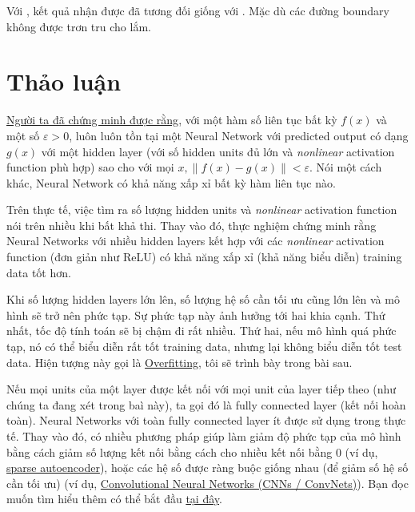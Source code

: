 \item Với , kết quả nhận được đã tương đối giống với . Mặc dù các đường boundary không được trơn tru cho lắm. 
 
 
\section{Thảo luận}
 
\item \href{http://www.dartmouth.edu/~gvc/Cybenko_MCSS.pdf}{Người ta đã chứng minh được rằng}, với một hàm số liên tục bất kỳ $f(x)$ và một số $\varepsilon >0$, luôn luôn tồn tại một Neural Network với predicted output có dạng $g(x)$ với một hidden layer (với số hidden units đủ lớn và \textit{nonlinear} activation function phù hợp) sao cho với mọi $x, \|f(x) - g(x)\| < \varepsilon$. Nói một cách khác, Neural Network có khả năng xấp xỉ bất kỳ hàm liên tục nào. 
 
\item Trên thực tế, việc tìm ra số lượng hidden units và \textit{nonlinear} activation function nói trên nhiều khi bất khả thi. Thay vào đó, thực nghiệm chứng minh rằng Neural Networks với nhiều hidden layers kết hợp với các \textit{nonlinear} activation function (đơn giản như ReLU) có khả năng xấp xỉ (khả năng biểu diễn) training data tốt hơn. 
 
\item Khi số lượng hidden layers lớn lên, số lượng hệ số cần tối ưu cũng lớn lên và mô hình sẽ trở nên phức tạp. Sự phức tạp này ảnh hưởng tới hai khia cạnh. Thứ nhất, tốc độ tính toán sẽ bị chậm đi rất nhiều. Thứ hai, nếu mô hình quá phức tạp, nó có thể biểu diễn rất tốt training data, nhưng lại không biểu diễn tốt test data. Hiện tượng này gọi là \href{https://en.wikipedia.org/wiki/Overfitting}{Overfitting}, tôi sẽ trình bày trong bài sau. 
 
\item Nếu mọi units của một layer được kết nối với mọi unit của layer tiếp theo (như chúng ta đang xét trong baì này), ta gọi đó là fully connected layer (kết nối hoàn toàn). Neural Networks với toàn fully connected layer ít được sử dụng trong thực tế. Thay vào đó, có nhiều phương pháp giúp làm giảm độ phức tạp của mô hình bằng cách giảm số lượng kết nối bằng cách cho nhiều kết nối bằng 0 (ví dụ, \href{https://web.stanford.edu/class/cs294a/sparseAutoencoder_2011new.pdf}{sparse autoencoder}), hoặc các hệ số được ràng buộc giống nhau (để giảm số hệ số cần tối ưu) (ví dụ, \href{http://cs231n.github.io/convolutional-networks/}{Convolutional Neural Networks (CNNs / ConvNets)}). Bạn đọc muốn tìm hiểu thêm có thể bắt đầu \href{http://deeplearning.net}{tại đây}. 
 
